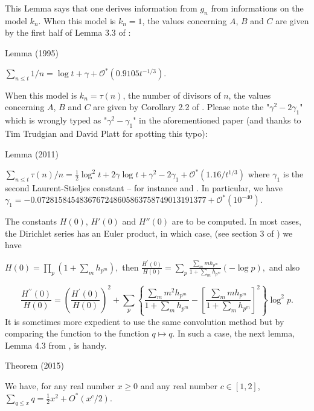 This Lemma says that one derives information from $g_n$ from informations on
the model $k_n$. When this model is $k_n=1$, the values concerning $A$,
$B$ and $C$ are given by 
the first half of Lemma 3.3 of
\cite{Ramare*95}:

\par 
\begin{thm}{Lemma (1995)}

$
\sum_{n\le t}1/n=\log t+\gamma+\mathcal{O}^*(0.9105 t^{-1/3}).
$
\end{thm}


When this model is $k_n=\tau(n)$, the number of divisors of $n$, the values concerning $A$,
$B$ and $C$ are given by Corollary 2.2 of
\cite{Berkane-Bordelles-Ramare*11}. Please
note the "$\gamma^2-2\gamma_1$" which is wrongly typed as
"$\gamma^2-\gamma_1$" in the aforementioned paper (and thanks to Tim
Trudgian and David Platt for spotting this typo):

\par 
\begin{thm}{Lemma (2011)}

  $
    \sum_{n\le t}\tau(n)/n
    =\tfrac12\log^2t+2\gamma\log t
    +\gamma^2-2\gamma_1+ \mathcal{O}^*(1.16/t^{1/3})
  $
  where $\gamma_1$ is the second Laurent-Stieljes constant --
  for instance \cite{Kreminski*03}
 and \cite{Coffey*06}. In particular, we have
  $
    \gamma_1=
    -0.0728158454836767248605863758749013191377
    + \mathcal{O}^*(10^{-40}).
  $
\end{thm}

The constants $H(0)$, $H'(0)$ and $H''(0)$ are to be computed. In most cases,
the Dirichlet series has an Euler product, in which case,
(see section 3 of
\cite{Ramare*95})
 we have
\par 
$
H(0)=\prod_p(1+\sum_mh_{p^m}),
$
then
$\displaystyle
\frac{H^{\prime}(0)}{H(0)}=
\sum_p
\frac{\sum_mmh_{p^m}}{1+\sum_mh_{p^m}}(-\log p),
$
and also
\par 
$$
\frac{H^{\prime\prime}(0)}{H(0)}=
\left(
\frac{H^{\prime}(0)}{H(0)}
\right)^2+
\sum_p
\left\{
\frac{\sum_mm^2h_{p^m}}{1+\sum_mh_{p^m}}
-\left[\frac{\sum_mmh_{p^m}}{1+\sum_mh_{p^m}}\right]^2
\right\}
\log^2p.
$$
It is sometimes more expedient to use the same convolution method but
by comparing the function to the function $q\mapsto q$. In such a
case, the next lemma, Lemma 4.3 from
\cite{Ramare*13d},
is handy.
\begin{thm}{Theorem (2015)}

  We have, for any real number $x\ge0$ and any real number $c\in[1,2]$,
  $\displaystyle \sum_{q\le x}q=\tfrac12 x^2+O^*(x^c/2)$.
\end{thm}

